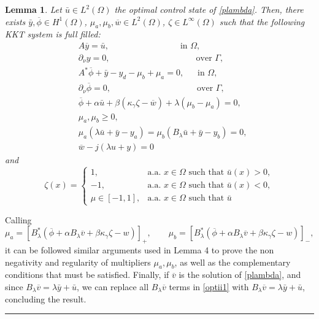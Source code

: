\documentclass[11pt,a4paper]{amsart}
\newcommand{\kw}{\rule{2mm}{2mm}}
\newcommand{\om}{\Omega}
\renewenvironment{proof}{{Proof.}}{\hfill\kw}
\newtheorem{lemma}{{Lemma}}
\begin{document}
\begin{lemma}
Let $\bar{u}\in L^2(\om)$ the optimal control state of \eqref{plambda}. Then, there exists $\bar{y}, \overline{\phi}\in H^1(\om)$, $\mu_a,\mu_b, \overline{w}\in L^2(\om)$, $\zeta\in L^{\infty}(\om)$ such that the following KKT system is full filled:
\begin{equation}\label{opti3}
\begin{split}
	&A \overline y=\bar{u}, \qquad\qquad\qquad\qquad \; \mbox{in }\om,\\
	&\partial_{\nu} y=0, \qquad\qquad\qquad\qquad\qquad \mbox{over }\Gamma,\\
	&A^*\overline{\phi}+\bar{y}-y_d-\mu_{b}+\mu_{a}=0,\quad \;\;\mbox{in }\om,\\
	&\partial_{\nu}\overline{\phi}=0,\qquad\qquad\qquad\qquad\qquad \mbox{over }\Gamma,\\
	&\overline{\phi}+\alpha \bar{u}+\beta( \kappa_{\gamma}\zeta-\overline{w})+\lambda( \mu_b- \mu_a)=0,\\
	&\mu_{a}, \mu_{b}\ge 0,\\
	&\mu_{a}(\lambda\bar{u}+\bar{y}-y_a)=\mu_{b}(B_\lambda\bar{u}+\bar{y}-y_b)=0,\\
    &\overline{w}-j(\lambda u+y)=0
\end{split}
\end{equation}
and
\[
\zeta(x)=\begin{cases}
		1, & \mbox{a.a. }x\in \om \mbox{ such that } \bar{u}(x)>0,\\
		-1, & \mbox{a.a. }x\in \om \mbox{ such that } \bar{u}(x)<0,\\
		\mu \in [-1,1], &\mbox{a.a. }x\in \om \mbox{ such that } \bar{u}
  \end{cases}
\]
\end{lemma}

\begin{proof}
    Calling 
    \[
    \mu_a=[B_{\lambda}^*(\overline{\phi}+\alpha B_{\lambda}\overline{v}+\beta\kappa_{\gamma}\zeta-w)]_{+},\qquad
    \mu_b=[B_{\lambda}^*(\overline{\phi}+\alpha B_{\lambda}\overline{v}+\beta\kappa_{\gamma}\zeta-w)]_{-}, 
\]
it can be followed similar arguments used in Lemma 4 to prove the non negativity and regularity of multipliers $\mu_a, \mu_b$, as well as the complementary conditions that must be satisfied. Finally, if $\overline{v}$ is the solution of \eqref{plambda}, and since $B_{\lambda}\overline{v}=\lambda\bar{y}+\bar{u}$, we can replace all $B_{\lambda}\overline{v}$ terms in \eqref{optii1} with  $B_{\lambda}\overline{v}=\lambda\bar{y}+\bar{u}$, concluding the result. 
\end{proof}
\end{document}

